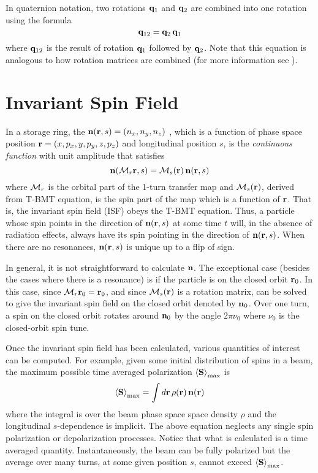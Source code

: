 In quaternion notation, two rotations ${\bf q}_1$ and ${\bf q}_2$ are combined into one rotation using the formula
\begin{equation}
  {\bf q}_{12} = {\bf q}_2 \, {\bf q}_1
\end{equation}
where ${\bf q}_{12}$ is the result of rotation ${\bf q}_1$ followed by ${\bf q}_2$. Note that this equation
is analogous to how rotation matrices are combined (for more information see \cite{b:quat}).

\section{Invariant Spin Field}
\label{s:isf}

In a storage ring, the  ${\bf n}({\bf r}, s) = (n_x, n_y, n_z)$
\cite{b:spin.hoff,b:duan15}, which is a function of phase space position ${\bf r} = (x, p_x, y, p_y, z,
p_z)$ and longitudinal position $s$, is the {\em continuous function} with unit amplitude that
satisfies
\begin{equation}
  {\bf n}({\cal M}_r {\bf r}, s) = {\cal M}_s({\bf r}) \, {\bf n}({\bf r}, s)
  \label{nmrs}
\end{equation}
where ${\cal M}_r$ is the orbital part of the 1-turn transfer map and ${\cal M}_s({\bf r})$, derived from
T-BMT equation, is the spin part of the map which is a function of ${\bf r}$. That is, the invariant
spin field (ISF) obeys the T-BMT equation. Thus, a particle whose spin points in the direction of
${\bf n}({\bf r}, s)$ at some time $t$ will, in the absence of radiation effects, always have its spin
pointing in the direction of ${\bf n}({\bf r}, s)$. When there are no resonances, ${\bf n}({\bf r}, s)$ is
unique up to a flip of sign.

In general, it is not straightforward to calculate ${\bf n}$. The exceptional case (besides the cases
where there is a resonance) is if the particle is on the closed orbit ${\bf r}_0$. In this case, since
${\cal M}_r {\bf r}_0 = {\bf r}_0$, and since ${\cal M}_s({\bf r})$ is a rotation matrix,  can be solved
to give the invariant spin field on the closed orbit denoted by ${\bf n}_0$.  Over one turn, a spin on
the closed orbit rotates around ${\bf n}_0$ by the angle $2 \pi \nu_0$ where $\nu_0$ is the
closed-orbit spin tune.

Once the invariant spin field has been calculated, various quantities of interest can be
computed. For example, given some initial distribution of spins in a beam, the maximum possible time
averaged polarization $\left< {\bf S} \right>_{\max}$ is
\begin{equation}
  \left< {\bf S} \right>_{\max} = \int d{\bf r} \, \rho({\bf r}) \, {\bf n}({\bf r})
\end{equation}
where the integral is over the beam phase space space density $\rho$ and the longitudinal
$s$-dependence is implicit. The above equation neglects any single spin polarization or
depolarization processes. Notice that what is calculated is a time averaged quantity.
Instantaneously, the beam can be fully polarized but the average over many turns, at some given
position $s$, cannot exceed $\left< {\bf S} \right>_{\max}$.


